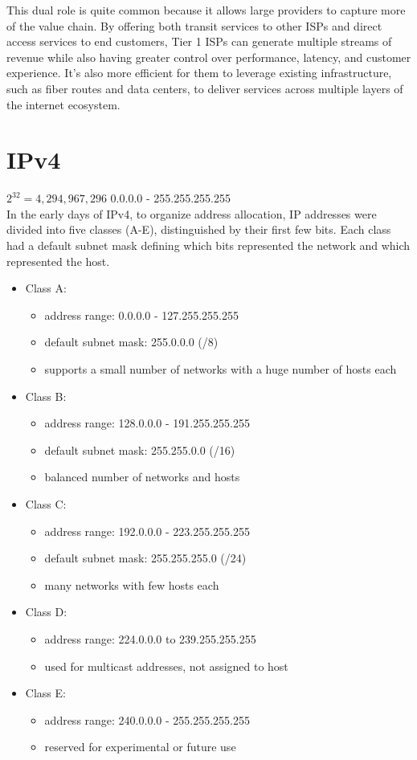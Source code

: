 \documentclass{article}
\begin{document}
This dual role is quite common because it allows large providers to capture more of the value chain. By offering both transit services to other ISPs and direct access services to end customers, Tier 1 ISPs can generate multiple streams of revenue while also having greater control over performance, latency, and customer experience. It’s also more efficient for them to leverage existing infrastructure, such as fiber routes and data centers, to deliver services across multiple layers of the internet ecosystem.\\

\section*{IPv4}
$2^{32} = 4,294,967,296$ 0.0.0.0 - 255.255.255.255\\
In the early days of IPv4, to organize address allocation, IP addresses were divided into five classes (A-E), distinguished by their first few bits. Each class had a default subnet mask defining which bits represented the network and which represented the host.

	\begin{itemize}
		\item Class A:
			\begin{itemize}
				\item address range: 0.0.0.0 - 127.255.255.255
				\item default subnet mask: 255.0.0.0 (/8)
				\item supports a small number of networks with a huge number of hosts each
			\end{itemize}
		\item Class B:
			\begin{itemize}
				\item address range: 128.0.0.0 - 191.255.255.255
				\item default subnet mask: 255.255.0.0 (/16)
				\item balanced number of networks and hosts
			\end{itemize}
		\item Class C:
			\begin{itemize}
				\item address range: 192.0.0.0 - 223.255.255.255
				\item default subnet mask: 255.255.255.0 (/24)
				\item many networks with few hosts each
			\end{itemize}
		\item Class D:
			\begin{itemize}
				\item address range: 224.0.0.0 to 239.255.255.255
				\item used for multicast addresses, not assigned to host
			\end{itemize}
		\item Class E:
			\begin{itemize}
				\item address range: 240.0.0.0 - 255.255.255.255
				\item reserved for experimental or future use
			\end{itemize}
	\end{itemize}
\end{document}
